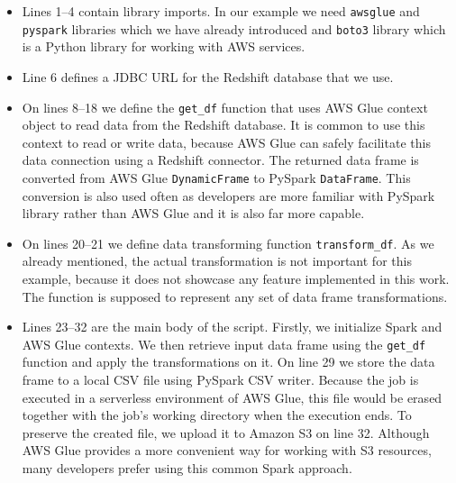 \begin{itemize}
    \item Lines 1--4 contain library imports. In our example we need \texttt{awsglue} and \texttt{pyspark} libraries which we have already introduced and \texttt{boto3} library which is a Python library for working with AWS services.
    \item Line 6 defines a JDBC URL for the Redshift database that we use.
    \item On lines 8--18 we define the \texttt{get\_df} function that uses AWS Glue context object to read data from the Redshift database. It is common to use this context to read or write data, because AWS Glue can safely facilitate this data connection using a Redshift connector. The returned data frame is converted from AWS Glue \texttt{DynamicFrame} to PySpark \texttt{DataFrame}. This conversion is also used often as developers are more familiar with PySpark library rather than AWS Glue and it is also far more capable.
    \item On lines 20--21 we define data transforming function \texttt{transform\_df}. As we already mentioned, the actual transformation is not important for this example, because it does not showcase any feature implemented in this work. The function is supposed to represent any set of data frame transformations.
    \item Lines 23--32 are the main body of the script. Firstly, we initialize Spark and AWS Glue contexts. We then retrieve input data frame using the \texttt{get\_df} function and apply the transformations on it. On line 29 we store the data frame to a local CSV file using PySpark CSV writer. Because the job is executed in a serverless environment of AWS Glue, this file would be erased together with the job's working directory when the execution ends. To preserve the created file, we upload it to Amazon S3 on line 32. Although AWS Glue provides a more convenient way for working with S3 resources, many developers prefer using this common Spark approach. 
\end{itemize}

